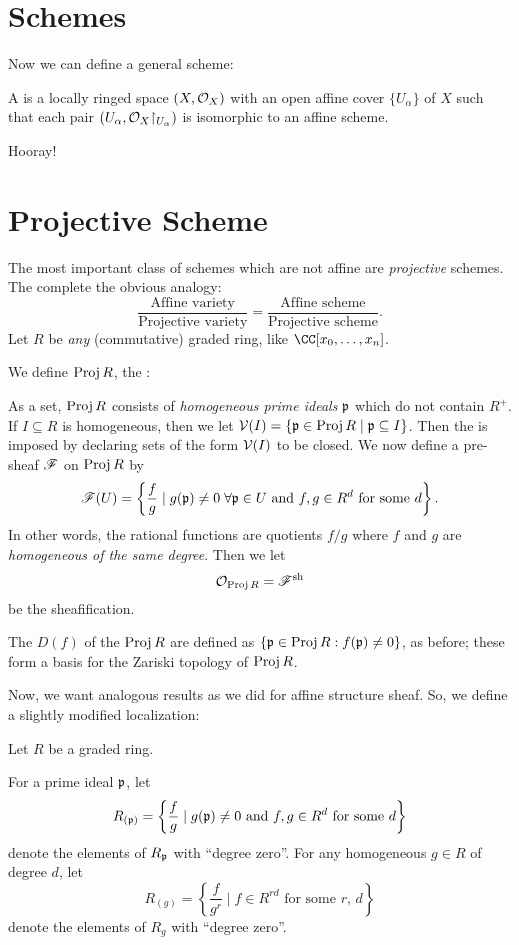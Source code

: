 \section{Schemes}
Now we can define a general scheme:
\begin{definition}
	A  is a locally ringed space $(X, \mathcal O_X)$
	with an open affine cover $\{U_\alpha\}$ of $X$
	such that each pair $(U_\alpha, \OO_X \restrict{U_\alpha})$
	is isomorphic to an affine scheme.
\end{definition}
Hooray!

\section{Projective Scheme}
The most important class of schemes which are not affine are
\emph{projective} schemes.
The complete the obvious analogy:
\[
	\frac{\text{Affine variety}}{\text{Projective variety}}
	= 
	\frac{\text{Affine scheme}}{\text{Projective scheme}}.
\]
Let $R$ be \emph{any} (commutative) graded ring, like $\CC[x_0, \dots, x_n]$.
\begin{definition}
	We define $\operatorname{Proj} R$, the :
	\begin{itemize}
		\ii As a set, $\operatorname{Proj} R$ consists of \emph{homogeneous prime ideals}
		$\mathfrak p$ which do not contain $R^+$.
		\ii If $I \subseteq R$ is homogeneous, then
		we let $\mathcal V(I) = \{ \mathfrak p \in \operatorname{Proj} R \mid \mathfrak p \subseteq I \}$.
		Then the  is imposed by declaring 
		sets of the form $\mathcal V(I)$ to be closed.
		\ii We now define a pre-sheaf $\mathscr F$ on $\operatorname{Proj} R$ by
		\[ \mathscr F(U) = 
			\left\{ \frac{f}{g} \mid 
			g(\mathfrak p) \neq 0 \; \forall \mathfrak p \in U \text{ and }
			f,g \in R^d \text{ for some $d$}
			\right\}.
		\]
		In other words, the rational functions are quotients $f/g$
		where $f$ and $g$ are \emph{homogeneous of the same degree}.
		Then we let \[ \mathcal O_{\operatorname{Proj} R} = \mathscr F^\mathrm{sh} \] be the sheafification.
	\end{itemize}
\end{definition}
\begin{definition}
	The  $D(f)$ of the $\operatorname{Proj} R$
	are defined as $\left\{ \mathfrak p \in \operatorname{Proj} R : f(\mathfrak p) \neq 0 \right\}$,
	as before; these form a basis for the Zariski topology of $\operatorname{Proj} R$.
\end{definition}
Now, we want analogous results as we did for affine structure sheaf.
So, we define a slightly modified localization:
\begin{definition}
	Let $R$ be a graded ring.
	\begin{enumerate}[(i)]
		\ii For a prime ideal $\mathfrak p$, let
		\[ R_{(\mathfrak p)} = \left\{ \frac fg \mid g(\mathfrak p) \neq 0 \text{ and }
			f, g \in R^d \text{ for some $d$} \right\} \]
		denote the elements of $R_\mathfrak p$ with ``degree zero''.
		\ii For any homogeneous $g \in R$ of degree $d$, let
		\[ R_{(g)} = \left\{ \frac{f}{g^r} \mid 
			f \in R^{rd} \text{ for some $r$, $d$} \right\} \]
		denote the elements of $R_g$ with ``degree zero''.
	\end{enumerate}
\end{definition}

